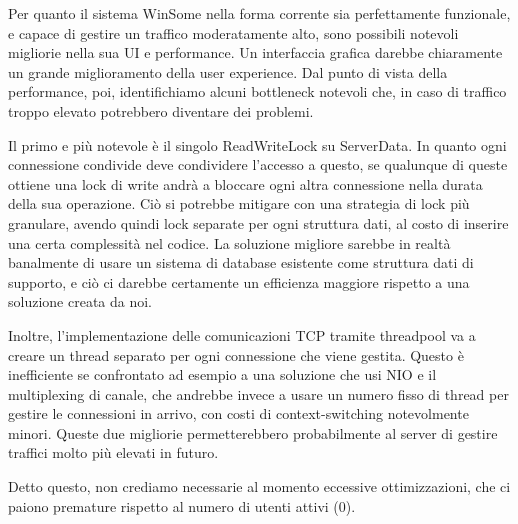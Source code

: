 \documentclass[11pt]{article}
\begin{document}
\begin{flushleft}
Per quanto il sistema WinSome nella forma corrente sia perfettamente funzionale, e capace di gestire un traffico moderatamente alto, sono possibili notevoli migliorie nella sua UI e performance.
Un interfaccia grafica darebbe chiaramente un grande miglioramento della user experience.
Dal punto di vista della performance, poi, identifichiamo alcuni bottleneck notevoli che, in caso di traffico troppo elevato potrebbero diventare dei problemi.

Il primo e più notevole è il singolo ReadWriteLock su ServerData. In quanto ogni connessione condivide deve condividere l'accesso a questo, se qualunque di queste ottiene una lock di write andrà a bloccare ogni altra connessione nella durata della sua operazione. Ciò si potrebbe mitigare con una strategia di lock più granulare, avendo quindi lock separate per ogni struttura dati, al costo di inserire una certa complessità nel codice. La soluzione migliore sarebbe in realtà banalmente di usare un sistema di database esistente come struttura dati di supporto, e ciò ci darebbe certamente un efficienza maggiore rispetto a una soluzione creata da noi.

Inoltre, l'implementazione delle comunicazioni TCP tramite threadpool va a creare un thread separato per ogni connessione che viene gestita. Questo è inefficiente se confrontato ad esempio a una soluzione che usi NIO e il multiplexing di canale, che andrebbe invece a usare un numero fisso di thread per gestire le connessioni in arrivo, con costi di context-switching notevolmente minori.
Queste due migliorie permetterebbero probabilmente al server di gestire traffici molto più elevati in futuro.

Detto questo, non crediamo necessarie al momento eccessive ottimizzazioni, che ci paiono premature rispetto al numero di utenti attivi (0).


\end{flushleft}
\end{document}
